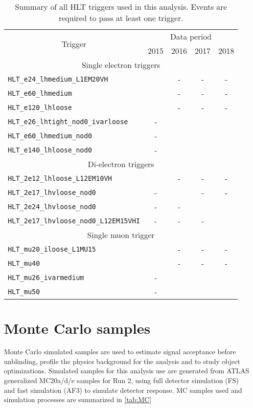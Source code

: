 \documentclass[../thesis.tex]{subfiles}
\begin{document}
\begin{table}[!ht]
\centering
\caption{\label{tab:ana:trigger}Summary of all \acs{HLT} triggers used in this analysis. Events are required to pass at least one trigger.}%
\begin{tabular}{p{9cm}|cccc}
\toprule\toprule
\multicolumn{1}{c|}{\multirow{ 2}{*}{Trigger}}	& \multicolumn{4}{c}{Data period} \\
\multicolumn{1}{c|}{}							& 2015	& 2016	& 2017	& 2018 \\
\midrule
\multicolumn{5}{c}{Single electron triggers} \\
\midrule
\verb|HLT_e24_lhmedium_L1EM20VH| 		& \checkmark & - & - & - \\
\verb|HLT_e60_lhmedium|					& \checkmark & - & - & - \\
\verb|HLT_e120_lhloose|					& \checkmark & - & - & - \\
\verb|HLT_e26_lhtight_nod0_ivarloose|	& - & \checkmark & \checkmark & \checkmark \\
\verb|HLT_e60_lhmedium_nod0|			& - & \checkmark & \checkmark & \checkmark \\
\verb|HLT_e140_lhloose_nod0|			& - & \checkmark & \checkmark & \checkmark \\
\midrule
\multicolumn{5}{c}{Di-electron triggers} \\
\midrule
\verb|HLT_2e12_lhloose_L12EM10VH |		& \checkmark & - & - & - \\
\verb|HLT_2e17_lhvloose_nod0| 			& - & \checkmark & - & - \\
\verb|HLT_2e24_lhvloose_nod0| 			& - & - & \checkmark & \checkmark \\
\verb|HLT_2e17_lhvloose_nod0_L12EM15VHI| 	& - & - & - & \checkmark \\
\midrule
\multicolumn{5}{c}{Single muon trigger} \\
\midrule
\verb|HLT_mu20_iloose_L1MU15| 			& \checkmark & - & - & - \\
\verb|HLT_mu40|							& \checkmark & - & - & - \\
\verb|HLT_mu26_ivarmedium| 				& - & \checkmark & \checkmark & \checkmark \\
\verb|HLT_mu50|							& - & \checkmark & \checkmark & \checkmark \\
\bottomrule\bottomrule
\end{tabular}
\end{table}

\section{Monte Carlo samples}
\label{sec:montecarlo}
Monte Carlo simulated samples are used to estimate signal acceptance before unblinding, profile the physics background for the analysis and to study object optimizations. Simulated samples for this analysis use are generated from ATLAS generalized MC20a/d/e samples for Run 2, using full detector simulation (\acs{FS}) and fast simulation (\acs{AF3}) to simulate detector response. \acs{MC} samples used and simulation processes are summarized in \autoref{tab:MC}
\end{document}
